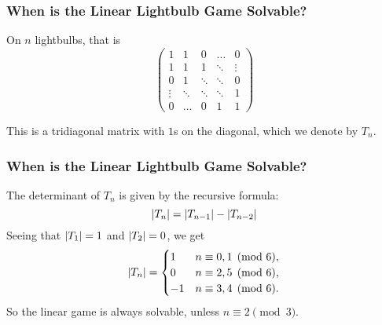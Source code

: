\documentclass{beamer}
\newcommand{\off}{white}
\DeclarePairedDelimiter\abs{\lvert}{\rvert}%
\begin{document}
\begin{frame}
\frametitle{When is the Linear Lightbulb Game Solvable?}
On $n$ lightbulbs, that is
\[
    \begin{pmatrix}
        1 & 1 & 0 & \dots & 0\\
        1 & 1 & 1 & \ddots & \vdots\\
        0 & 1 & \ddots & \ddots  & 0\\
        \vdots & \ddots & \ddots & \ddots & 1\\
        0 & \dots & 0 & 1 & 1
    \end{pmatrix}
\]

\begin{figure}[!h]
    \centering
\end{figure}
This is a tridiagonal matrix with $1$s on the diagonal, which we denote by $T_n$.
\end{frame}

\begin{frame}
\frametitle{When is the Linear Lightbulb Game Solvable?}
The determinant of $T_n$ is given by the recursive formula:
\[
    \abs{T_n} = \abs{T_{n-1}} - \abs{T_{n-2}}
\]
\pause
Seeing that $\abs{T_1} = 1$ and $\abs{T_2} = 0$, we get
\[
    \abs{T_n} = 
    \begin{cases}
        1 & n \equiv 0, 1 \pmod{6},\\
        0 & n \equiv 2, 5 \pmod{6},\\
        -1 & n \equiv 3,4 \pmod{6}.
    \end{cases}
\]
\pause
So the linear game is always solvable, unless $n \equiv 2 \pmod{3}$.
\end{frame}
\end{document}
